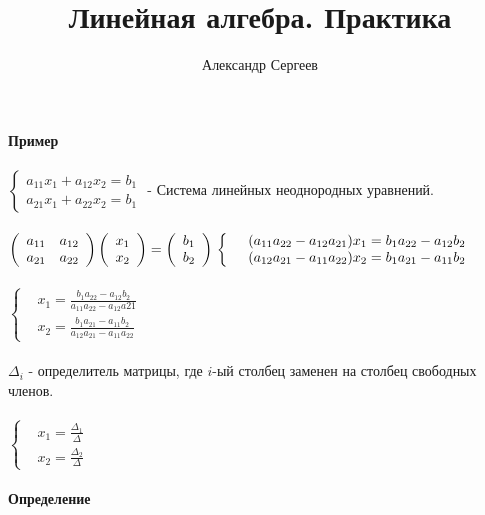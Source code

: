 \documentclass[12pt]{article}
\title{Линейная алгебра. Практика}
\author{Александр Сергеев}
\date{}
\begin{document}
\maketitle
\textbf{Пример}\\\\
$\left\{
\begin{array}{c}
     a_{11}x_1+a_{12}x_2=b_1 \\
     a_{21}x_1+a_{22}x_2=b_1
\end{array}
\right.$ - Система линейных неоднородных уравнений.\\\\
$\left(\begin{array}{cc}
    a_{11} & a_{12} \\
    a_{21} & a_{22}
\end{array}\right)
\left(\begin{array}{cc}
    x_1  \\
    x_2
\end{array}\right) = 
\left(\begin{array}{cc}
    b_1  \\
    b_2
\end{array}\right)\\\\
\left\{
\begin{array}{cc}
     & (a_{11}a_{22}-a_{12}a_{21})x_1=b_1a_{22}-a_{12}b_2 \\
     & (a_{12}a_{21}-a_{11}a_{22})x_2=b_1a_{21}-a_{11}b_2
\end{array}
\right.$\\\\
$\left\{
\begin{array}{cc}
     & x_1=\frac{b_1a_{22}-a_{12}b_2}{a_{11}a_{22}-a_{12}a{21}} \\
     & x_2=\frac{b_1a_{21}-a_{11}b_2}{a_{12}a_{21}-a_{11}a_{22}}
\end{array}
\right.$\\\\
$\Delta_i$ - определитель матрицы, где $i$-ый столбец заменен на столбец свободных членов.\\\\
$\left\{
\begin{array}{cc}
     & x_1=\frac{\Delta_1}{\Delta} \\
     & x_2=\frac{\Delta_2}{\Delta}
\end{array}
\right.$\\\\
\textbf{Определение}\\
\end{document}
